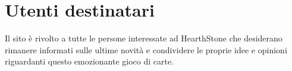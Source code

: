\section{Utenti destinatari}
Il sito è rivolto a tutte le persone interessate ad HearthStone che desiderano rimanere informati sulle ultime novità e condividere le proprie idee e opinioni riguardanti questo emozionante gioco di carte. 

\newpage